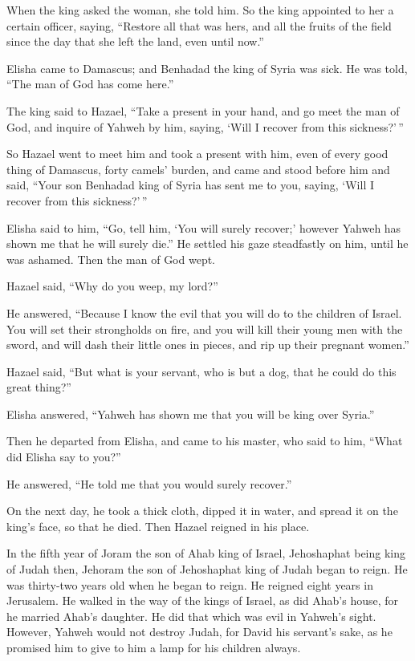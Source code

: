  When the king asked the woman, she told him. So the king
appointed to her a certain officer, saying, ``Restore all that was hers,
and all the fruits of the field since the day that she left the land,
even until now.''

 Elisha came to Damascus; and Benhadad the king of Syria was
sick. He was told, ``The man of God has come here.''

 The king said to Hazael, ``Take a present in your hand, and
go meet the man of God, and inquire of Yahweh by him, saying, `Will I
recover from this sickness?'\,''

 So Hazael went to meet him and took a present with him,
even of every good thing of Damascus, forty camels' burden, and came and
stood before him and said, ``Your son Benhadad king of Syria has sent me
to you, saying, `Will I recover from this sickness?'\,''

 Elisha said to him, ``Go, tell him, `You will surely
recover;' however Yahweh has shown me that he will surely die.''
 He settled his gaze steadfastly on him, until he was
ashamed. Then the man of God wept.

 Hazael said, ``Why do you weep, my lord?''

He answered, ``Because I know the evil that you will do to the children
of Israel. You will set their strongholds on fire, and you will kill
their young men with the sword, and will dash their little ones in
pieces, and rip up their pregnant women.''

 Hazael said, ``But what is your servant, who is but a dog,
that he could do this great thing?''

Elisha answered, ``Yahweh has shown me that you will be king over
Syria.''

 Then he departed from Elisha, and came to his master, who
said to him, ``What did Elisha say to you?''

He answered, ``He told me that you would surely recover.''

 On the next day, he took a thick cloth, dipped it in
water, and spread it on the king's face, so that he died. Then Hazael
reigned in his place.

 In the fifth year of Joram the son of Ahab king of Israel,
Jehoshaphat being king of Judah then, Jehoram the son of Jehoshaphat
king of Judah began to reign.  He was thirty-two years old
when he began to reign. He reigned eight years in Jerusalem.
 He walked in the way of the kings of Israel, as did Ahab's
house, for he married Ahab's daughter. He did that which was evil in
Yahweh's sight.  However, Yahweh would not destroy Judah,
for David his servant's sake, as he promised him to give to him a lamp
for his children always.

